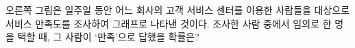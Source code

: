 \noindent\begin{minipage}[t]{0.58\linewidth}\vspace{0pt}\raggedright 오른쪽 그림은 일주일 동안 어느 회사의 고객 서비스 센터를 이용한 사람들을 대상으로 서비스 만족도를 조사하여 그래프로 나타낸 것이다. 조사한 사람 중에서 임의로 한 명을 택할 때, 그 사람이 ‘만족’으로 답했을 확률은? \end{minipage}\hfill\begin{minipage}[t]{0.4\linewidth}\vspace{0pt}\centering \resizebox{\ifdim\width>\linewidth\linewidth\else\width\fi}{!}{}\end{minipage}\par
{}
